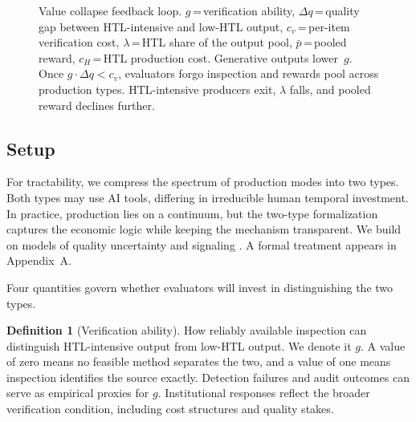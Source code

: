 \documentclass{article}
\theoremstyle{plain}
\theoremstyle{definition}
\newtheorem{definition}[theorem]{Definition}
\theoremstyle{remark}
\begin{document}
\begin{figure}[t]
{%
}
\caption{Value collapse feedback loop. $g$\,=\,verification ability, $\Delta q$\,=\,quality gap between HTL-intensive and low-HTL output, $c_v$\,=\,per-item verification cost, $\lambda$\,=\,HTL share of the output pool, $\bar{p}$\,=\,pooled reward, $c_H$\,=\,HTL production cost. Generative outputs lower~$g$. Once $g \cdot \Delta q < c_v$, evaluators forgo inspection and rewards pool across production types. HTL-intensive producers exit, $\lambda$ falls, and pooled reward declines further.}
\label{fig:value-collapse}
\end{figure}

\vspace{-1pt}

\subsection{Setup}
\label{sec:assumptions}

For tractability, we compress the spectrum of production modes into two types. Both types may use AI tools, differing in irreducible human temporal investment. In practice, production lies on a continuum, but the two-type formalization captures the economic logic while keeping the mechanism transparent. We build on models of quality uncertainty and signaling \citep{akerlof1970lemons, rothschild-stiglitz-1976-equilibrium, spence1973signaling}. A formal treatment appears in Appendix~A.

Four quantities govern whether evaluators will invest in distinguishing the two types.





\begin{definition}[Verification ability]
\label{def:g}
How reliably available inspection can distinguish HTL-intensive output from low-HTL output. We denote it $g$. A value of zero means no feasible method separates the two, and a value of one means inspection identifies the source exactly. Detection failures and audit outcomes can serve as empirical proxies for $g$. Institutional responses reflect the broader verification condition, including cost structures and quality stakes.
\end{definition}
\end{document}
